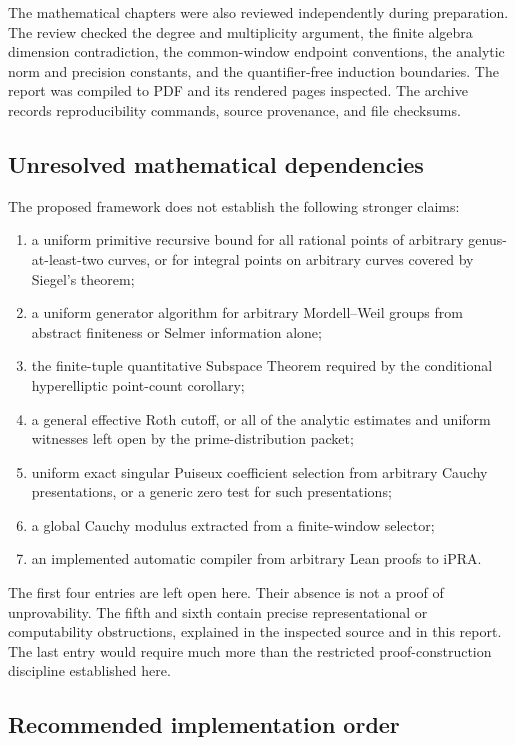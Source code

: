The mathematical chapters were also reviewed independently during
preparation. The review checked the degree and multiplicity argument,
the finite algebra dimension contradiction, the common-window endpoint
conventions, the analytic norm and precision constants, and the
quantifier-free induction boundaries. The report was compiled to PDF
and its rendered pages inspected. The archive records reproducibility
commands, source provenance, and file checksums.

\subsection{Unresolved mathematical dependencies}

The proposed framework does not establish the following stronger claims:
\begin{enumerate}
\item a uniform primitive recursive bound for all rational points of
arbitrary genus-at-least-two curves, or for integral points on arbitrary
curves covered by Siegel's theorem;
\item a uniform generator algorithm for arbitrary Mordell--Weil groups
from abstract finiteness or Selmer information alone;
\item the finite-tuple quantitative Subspace Theorem required by the
conditional hyperelliptic point-count corollary;
\item a general effective Roth cutoff, or all of the analytic estimates
and uniform witnesses left open by the prime-distribution packet;
\item uniform exact singular Puiseux coefficient selection from arbitrary
Cauchy presentations, or a generic zero test for such presentations;
\item a global Cauchy modulus extracted from a finite-window selector;
\item an implemented automatic compiler from arbitrary Lean proofs to iPRA.
\end{enumerate}
The first four entries are left open here. Their absence is not a proof
of unprovability. The fifth and sixth contain precise representational
or computability obstructions, explained in the inspected source and
in this report. The last entry would require much more than the
restricted proof-construction discipline established here.

\subsection{Recommended implementation order}

